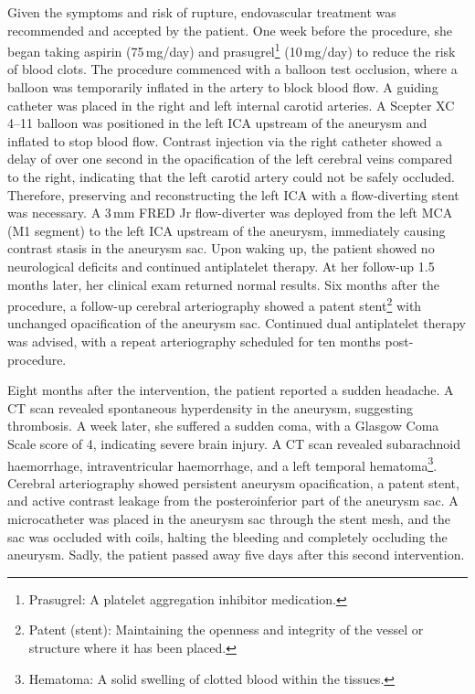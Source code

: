 Given the symptoms and risk of rupture, endovascular treatment was recommended and accepted by the patient. One week before the procedure, she began taking aspirin (75\,mg/day) and prasugrel\footnote{Prasugrel: A platelet aggregation inhibitor medication.} (10\,mg/day) to reduce the risk of blood clots. The procedure commenced with a balloon test occlusion, where a balloon was temporarily inflated in the artery to block blood flow. A guiding catheter was placed in the right and left internal carotid arteries. A Scepter XC 4--11 balloon was positioned in the left ICA upstream of the aneurysm and inflated to stop blood flow. Contrast injection via the right catheter showed a delay of over one second in the opacification of the left cerebral veins compared to the right, indicating that the left carotid artery could not be safely occluded. Therefore, preserving and reconstructing the left ICA with a flow-diverting stent was necessary. A 3\,mm FRED Jr flow-diverter was deployed from the left MCA (M1 segment) to the left ICA upstream of the aneurysm, immediately causing contrast stasis in the aneurysm sac. Upon waking up, the patient showed no neurological deficits and continued antiplatelet therapy. At her follow-up 1.5 months later, her clinical exam returned normal results. Six months after the procedure, a follow-up cerebral arteriography showed a patent stent\footnote{Patent (stent): Maintaining the openness and integrity of the vessel or structure where it has been placed.} with unchanged opacification of the aneurysm sac. Continued dual antiplatelet therapy was advised, with a repeat arteriography scheduled for ten months post-procedure.

Eight months after the intervention, the patient reported a sudden headache. A CT scan revealed spontaneous hyperdensity in the aneurysm, suggesting thrombosis. A week later, she suffered a sudden coma, with a Glasgow Coma Scale score of 4, indicating severe brain injury. A CT scan revealed subarachnoid haemorrhage, intraventricular haemorrhage, and a left temporal hematoma\footnote{Hematoma: A solid swelling of clotted blood within the tissues.}. Cerebral arteriography showed persistent aneurysm opacification, a patent stent, and active contrast leakage from the posteroinferior part of the aneurysm sac. A microcatheter was placed in the aneurysm sac through the stent mesh, and the sac was occluded with coils, halting the bleeding and completely occluding the aneurysm. Sadly, the patient passed away five days after this second intervention.

